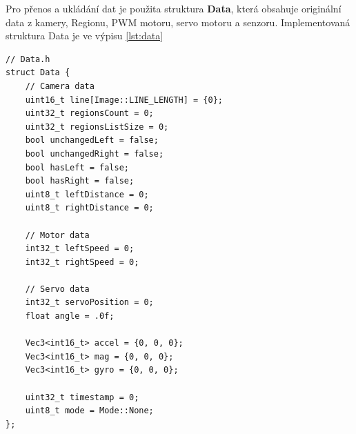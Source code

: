 Pro přenos a ukládání dat je použita struktura \textbf{Data}, která obsahuje
originální data z kamery, Regionu, PWM motoru, servo motoru a senzoru.
Implementovaná struktura Data je ve výpisu \ref{lst:data}
\begin{lstlisting}[caption = Struktura Data, label = lst:data]
// Data.h
struct Data {
    // Camera data
    uint16_t line[Image::LINE_LENGTH] = {0};
    uint32_t regionsCount = 0;
    uint32_t regionsListSize = 0;
    bool unchangedLeft = false;
    bool unchangedRight = false;
    bool hasLeft = false;
    bool hasRight = false;
    uint8_t leftDistance = 0;
    uint8_t rightDistance = 0;

    // Motor data
    int32_t leftSpeed = 0;
    int32_t rightSpeed = 0;

    // Servo data
    int32_t servoPosition = 0;
    float angle = .0f;

    Vec3<int16_t> accel = {0, 0, 0};
    Vec3<int16_t> mag = {0, 0, 0};
    Vec3<int16_t> gyro = {0, 0, 0};

    uint32_t timestamp = 0;
    uint8_t mode = Mode::None;
};
\end{lstlisting}

\endinput
